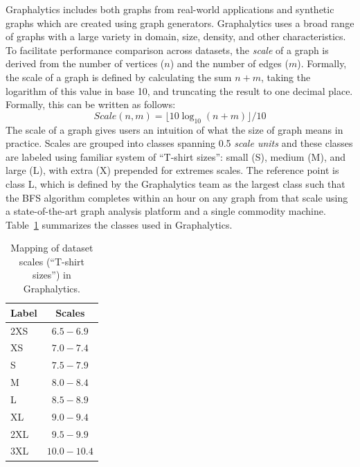 Graphalytics includes both graphs from real-world applications and synthetic graphs which are created using graph generators. Graphalytics uses a broad range of graphs with a large variety in domain, size, density, and other characteristics. To facilitate performance comparison across datasets, the \emph{scale} of a graph is derived from the number of vertices ($n$) and the number of edges ($m$). Formally, the scale of a graph is defined by calculating the sum $n + m$, taking the logarithm of this value in base 10, and truncating the result to one decimal place. Formally, this can be written as follows:
%
\begin{equation}
\textit{Scale}(n, m) = \lfloor 10 \log_{10}(n + m) \rfloor / 10
\end{equation}
%
The scale of a graph gives users an intuition of what the size of graph means in practice. Scales are grouped into classes spanning 0.5 \emph{scale units} and these classes are labeled using familiar system of ``T-shirt sizes'': small (S), medium (M), and large (L), with extra (X) prepended for extremes scales. The reference point is class L, which is defined by the Graphalytics team as the largest class such that the BFS algorithm completes within an hour on any graph from that scale using a state-of-the-art graph analysis platform and a single commodity machine. Table~\ref{tab:definition_scales} summarizes the classes used in Graphalytics.


\begin{table}
\caption{Mapping of dataset scales (``T-shirt sizes'') in Graphalytics.}
\label{tab:definition_scales}

\centering
\begin{tabular}{|l||c|}
\hline
\textbf{Label} & \textbf{Scales} \\ %
\hline \hline
2XS & $6.5 - 6.9$ %
\\ \hline
XS & $7.0 - 7.4$ %
\\ \hline
S & $7.5-7.9$ %
 \\ \hline
M & $8.0 - 8.4$ %
\\ \hline
L & $8.5 - 8.9$ %
\\ \hline
XL & $9.0 - 9.4$ %
 \\ \hline
2XL & $9.5 - 9.9$ %
\\ \hline
3XL & $10.0 - 10.4$ %
\\ \hline
\end{tabular}
\end{table}


